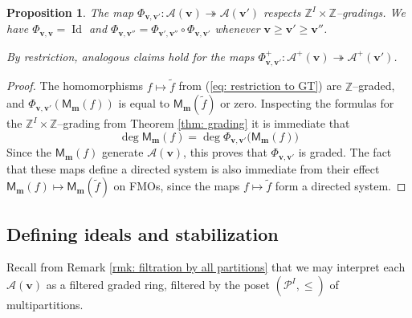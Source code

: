 \documentclass[11pt,reqno]{amsart}
\renewcommand{\mathbf}{\mathbold}
\numberwithin{equation}{section}
\newtheorem{Proposition}[equation]{Proposition}
\theoremstyle{definition}
\newcommand{\cA}{\mathcal{A}}
\newcommand{\cP}{\mathcal{P}}
\newcommand{\bm}{\mathbf{m}}
\newcommand{\bv}{\mathbf{v}}
\newcommand{\ZZ}{\mathbb{Z}}
\renewcommand{\tilde}[1]{\widetilde{#1}}
\renewcommand{\bv}{\mathbf{v}} %
\newcommand{\M}{\mathsf{M}}
\newcommand{\vertexset}{I}
\newcommand{\Partitions}{\cP}
\newcommand{\qzast}{\cA}
\newcommand{\qzastplus}{\cA^{+}}
\begin{document}
\begin{Proposition}
\label{prop: surjections respect gradings}
The map $\Phi_{\bv, \bv'}: \qzast(\bv) \twoheadrightarrow \qzast(\bv')$ respects $\ZZ^\vertexset \times \ZZ$--gradings.
We have $\Phi_{\bv, \bv} = \operatorname{Id}$ and  $\Phi_{\bv, \bv''} = \Phi_{\bv',\bv''} \circ \Phi_{\bv,\bv'}$ whenever $\bv \geq \bv' \geq \bv''$.  

By restriction, analogous claims hold for the maps $\Phi_{\bv,\bv'}^+ : \qzastplus(\bv) \twoheadrightarrow \qzastplus(\bv')$.
\end{Proposition}
\begin{proof}
The homomorphisms $f \mapsto \widetilde{f}$ from (\ref{eq: restriction to GT}) are $\ZZ$--graded, and $\Phi_{\bv,\bv'}(\M_\bm(f))$ is equal to $\M_\bm(\tilde{f})$ or zero. Inspecting the formulas for the $\ZZ^\vertexset\times \ZZ$--grading from Theorem \ref{thm: grading} it is immediate that
$$
\deg \M_\bm(f) = \deg \Phi_{\bv,\bv'} \big( \M_\bm(f) \big)
$$
Since the $\M_\bm(f)$ generate $\qzast(\bv)$, this proves that $\Phi_{\bv, \bv'}$ is graded.  The fact that these maps define a directed system is also immediate from their effect $\M_\bm(f) \mapsto \M_\bm(\widetilde{f})$ on FMOs, since the maps $f\mapsto \widetilde{f}$ form a directed system.
\end{proof}



\subsection{Defining ideals and stabilization}
Recall from Remark \ref{rmk: filtration by all partitions} that we may interpret each $\qzast(\bv)$ as a filtered graded ring, filtered by the poset $(\Partitions^\vertexset, \leq)$ of multipartitions.
\end{document}
